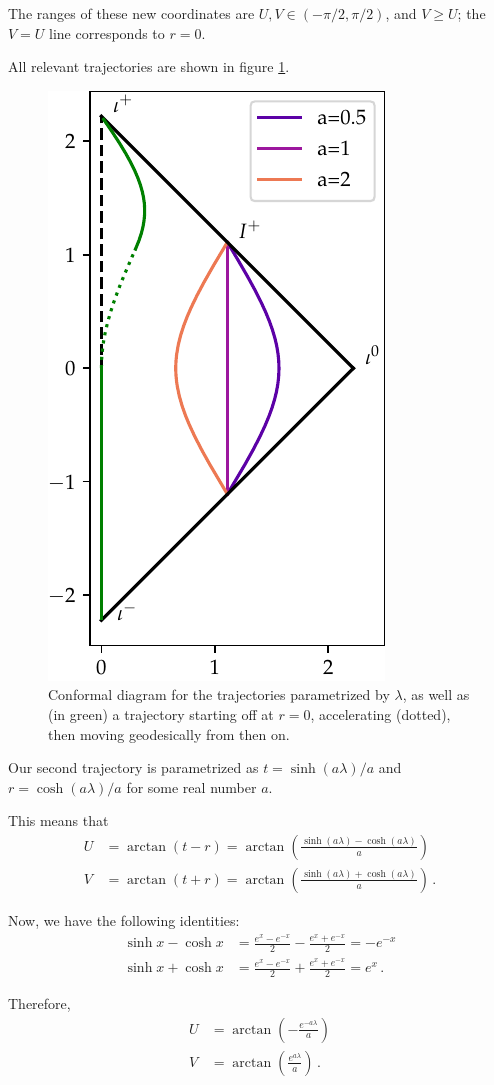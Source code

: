 \documentclass[main.tex]{subfiles}
\begin{document}
The ranges of these new coordinates are \(U, V \in (- \pi /2, \pi /2)\), 
and \(V \geq U\); the \(V = U\) line corresponds to \(r = 0\). 

All relevant trajectories are shown in figure \ref{fig:conformal_trajectory}. 

\begin{figure}[ht]
\centering
\includegraphics[width=.35\textwidth]{figures/conformal_trajectory}
\caption{Conformal diagram for the trajectories parametrized by \(\lambda \), as well as (in green) a trajectory starting off at \(r = 0\), accelerating (dotted), then moving geodesically from then on.}
\label{fig:conformal_trajectory}
\end{figure}

Our second trajectory is parametrized as \(t = \sinh(a \lambda ) / a\) and \(r = \cosh(a \lambda ) / a\) 
for some real number \(a\).

This means that %
\begin{align}
U &= \arctan(t-r) = \arctan(\frac{\sinh(a \lambda ) - \cosh(a \lambda )}{a})  \\
V &= \arctan(t+r) = \arctan(\frac{\sinh(a \lambda ) + \cosh(a \lambda )}{a})
\,.
\end{align}

Now, we have the following identities: %
\begin{align}
\sinh x - \cosh x &= \frac{e^x - e^{-x}}{2} - \frac{e^x + e^{-x}}{2} = - e^{-x}  \\
\sinh x + \cosh x &= \frac{e^x - e^{-x}}{2} + \frac{e^x + e^{-x}}{2} = e^{x}  
\,.
\end{align}

Therefore, %
\begin{align}
U &= \arctan(- \frac{e^{-a \lambda }}{a}) \\
V &= \arctan(\frac{e^{a \lambda }}{a})
\,.
\end{align}
\end{document}
